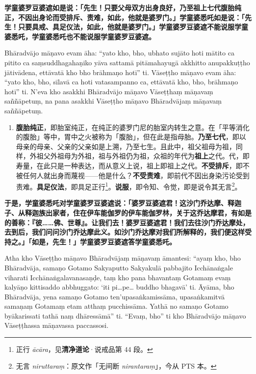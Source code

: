 \textbf{学童婆罗豆婆遮如是说：「先生！只要父母双方出身良好，乃至祖上七代腹胎纯正，不因出身论而受排斥、责难，如此，他就是婆罗门。」学童婆悉吒如是说：「先生！只要具戒、具足仪法，如此，他就是婆罗门。」学童婆罗豆婆遮不能说服学童婆悉吒，学童婆悉吒也不能说服学童婆罗豆婆遮。}

Bhāradvājo māṇavo evam āha: “yato kho, bho, ubhato sujāto hoti mātito ca pitito ca saṃsuddhagahaṇiko yāva sattamā pitāmahayugā akkhitto anupakkuṭṭho jātivādena, ettāvatā kho bho brāhmaṇo hotī” ti. Vāseṭṭho māṇavo evam āha: “yato kho, bho, sīlavā ca hoti vatasampanno ca, ettāvatā kho, bho, brāhmaṇo hotī” ti. N’eva kho asakkhi Bhāradvājo māṇavo Vāseṭṭhaṃ māṇavaṃ saññāpetuṃ, na pana asakkhi Vāseṭṭho māṇavo Bhāradvājaṃ māṇavaṃ saññāpetuṃ.

\begin{enumerate}\item \textbf{腹胎纯正}，即胎室纯正，在纯正的婆罗门尼的胎室内转生之意。在「平等消化的腹胎」等中，胃中之火被称为「腹胎」，但在此是指母胎。\textbf{乃至七代}，即以母亲的母亲、父亲的父亲如是上溯，乃至七生。且此中，祖父祖母为祖，同样，外祖父外祖母为外祖，祖与外祖仍为祖，众祖的年代为\textbf{祖上}之代。代，即寿量，在此只是一种表达，而从意义上说，祖上即祖上之代。\textbf{不受排斥}，即不被任何人就出身而蔑视——他是什么？\textbf{不受责难}，即前代不因出身染污论受到责难。\textbf{具足仪法}，即具足正行\footnote{正行 \textit{ācāra}，见\textbf{清净道论}·说戒品第 44 段。}。\textbf{说服}，即令知、令觉，即是说令其无言\footnote{无言 \textit{niruttaraṃ}：原文作「无间断 \textit{nirantaraṃ}」，今从 PTS 本。}。\end{enumerate}

\textbf{于是，学童婆悉吒对学童婆罗豆婆遮说：「婆罗豆婆遮君！这沙门乔达摩、释迦子、从释迦族出家者，住在伊车能伽罗的伊车能伽罗林，关于这乔达摩君，有如是的善称：『彼……佛、世尊』。让我们去！婆罗豆婆遮君！我们去往沙门乔达摩处，去到后，我们问问沙门乔达摩此义。如沙门乔达摩对我们所解释的，我们便这样受持之。」「如是，先生！」学童婆罗豆婆遮答学童婆悉吒。}

Atha kho Vāseṭṭho māṇavo Bhāradvājaṃ māṇavaṃ āmantesi: “ayaṃ kho, bho Bhāradvāja, samaṇo Gotamo Sakyaputto Sakyakulā pabbajito Icchānaṅgale viharati Icchānaṅgalavanasaṇḍe, taṃ kho pana bhavantaṃ Gotamaṃ evaṃ kalyāṇo kittisaddo abbhuggato: ‘iti pi…pe… buddho bhagavā’ ti. Āyāma, bho Bhāradvāja, yena samaṇo Gotamo ten’upasaṅkamissāma, upasaṅkamitvā samaṇaṃ Gotamaṃ etam atthaṃ pucchissāma. Yathā no samaṇo Gotamo byākarissati tathā naṃ dhāressāmā” ti. “Evaṃ, bho” ti kho Bhāradvājo māṇavo Vāseṭṭhassa māṇavassa paccassosi.

